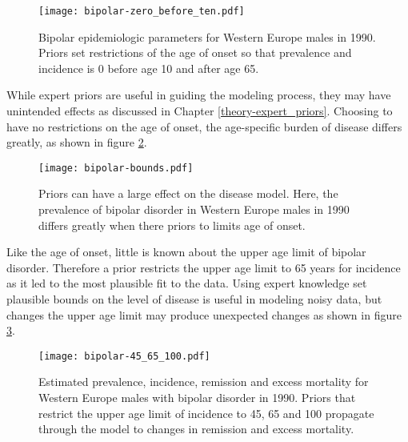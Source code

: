     \begin{figure}[h]
        \begin{center}
            \texttt{[image: bipolar-zero\_before\_ten.pdf]}
            \caption{Bipolar epidemiologic parameters for Western Europe males in 1990.  Priors set restrictions of the age of onset so that prevalence and incidence is 0 before age 10 and after age 65.}
            \label{fig:app-bipolar fit}
        \end{center}
    \end{figure}

While expert priors are useful in guiding the modeling process, they may have unintended effects as discussed in Chapter \ref{theory-expert_priors}.  Choosing to have no restrictions on the age of onset, the age-specific burden of disease differs greatly, as shown in figure \ref{fig:app-bipolar bounds}.

    \begin{figure}[h]
        \begin{center}
            \texttt{[image: bipolar-bounds.pdf]}
            \caption{Priors can have a large effect on the disease model.  Here, the prevalence of bipolar disorder in Western Europe males in 1990 differs greatly when there priors to limits age of onset.}
            \label{fig:app-bipolar bounds}
        \end{center}
    \end{figure}

Like the age of onset, little is known about the upper age limit of bipolar disorder.  Therefore a prior restricts the upper age limit to 65 years for incidence as it led to the most plausible fit to the data.  Using expert knowledge set plausible bounds on the level of disease is useful in modeling noisy data, but changes the upper age limit may produce unexpected changes as shown in figure \ref{fig:app-bipolar onset}.

    \begin{figure}[h]
        \begin{center}
            \texttt{[image: bipolar-45\_65\_100.pdf]}
            \caption{Estimated prevalence, incidence, remission and excess mortality for Western Europe males with bipolar disorder in 1990.  Priors that restrict the upper age limit of incidence to 45, 65 and 100 propagate through the model to changes in remission and excess mortality.}
            \label{fig:app-bipolar onset}
        \end{center}
    \end{figure}

